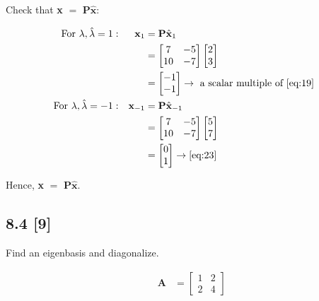 \documentclass{article}
\begin{document}
Check that \textbf{x} $=$ \textbf{P}$\hat{\textbf{x}}$:

\begin{align}
    \label{eq:35}
    \text{For } \lambda, \hat\lambda = 1: &&
    \textbf{x}_1 &= \textbf{P} \hat{\textbf{x}}_1
    \\
    \label{eq:36}
    && &= \begin{bmatrix}
    7 & -5\\
    10 & -7
    \end{bmatrix} \begin{bmatrix}
    2 \\3
    \end{bmatrix}
    \\
    \label{eq:37} &&
    &= \begin{bmatrix}
    -1\\-1
    \end{bmatrix} \rightarrow \text{ a scalar multiple of } \eqref{eq:19}
    \\
    \label{eq:38}
    \text{For } \lambda, \hat\lambda = -1:
    && \textbf{x}_{-1} &= \textbf{P}\hat{\textbf{x}}_{-1}
    \\
    \label{eq:39}
    && &= \begin{bmatrix}
    7 & -5\\
    10 & -7
    \end{bmatrix} \begin{bmatrix}
    5\\7
    \end{bmatrix}
    \\
    \label{eq:40}
    && &= \begin{bmatrix}
    0\\1
    \end{bmatrix} \rightarrow \eqref{eq:23}
\end{align}

Hence, \textbf{x} $=$ \textbf{P}$\hat{\textbf{x}}$.

\subsection*{8.4 [9]}
\setcounter{equation}{0}

Find an eigenbasis and diagonalize.

\begin{align}
    \label{eq:1}
    && \textbf{A} &= \begin{bmatrix}
    1&2\\2&4
    \end{bmatrix}
\end{align}
\end{document}
